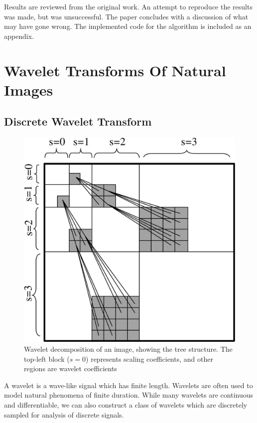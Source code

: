 \documentclass{IEEEtran}
\begin{document}
Results are reviewed from the original work.  An attempt to reproduce
the results was made, but was unsuccessful.  The paper concludes with
a discussion of what may have gone wrong.  The implemented code for
the algorithm is included as an appendix.

\section{Wavelet Transforms Of Natural Images}
\label{sec:wavelets}


\subsection{Discrete Wavelet Transform}

\begin{figure}[t]
  \centering
  \includegraphics{wavelet_tree}
  \caption{Wavelet decomposition of an image, showing the tree structure. The top-left block
($s = 0$) represents scaling coefficients, and other regions are wavelet coefficients}
\label{fig:tree}
\end{figure}

A wavelet is a wave-like signal which has finite length. Wavelets are often used to model natural phenomena of finite duration.  While many wavelets are continuous and differentiable, we can also construct a class of wavelets which are discretely sampled for analysis of discrete signals.
\end{document}
